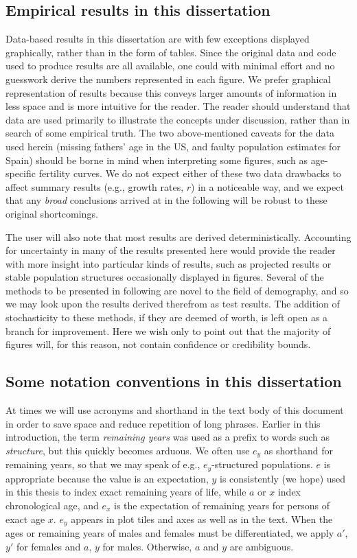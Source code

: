 \subsection{Empirical results in this dissertation}

Data-based results in this dissertation are with few exceptions displayed
graphically, rather than in the form of tables. Since the original data and
code used to produce results are all available, one could with minimal effort
and no guesswork derive the numbers represented in each figure. We prefer
graphical representation of results because this conveys larger amounts of
information in less space and is more intuitive for the reader. The reader
should understand that data are used primarily to illustrate the concepts under discussion, rather
than in search of some empirical truth. The two
above-mentioned caveats for the data used herein (missing fathers' age in the
US, and faulty population estimates for Spain) should be borne in mind when
interpreting some figures, such as age-specific fertility curves. We do not
expect either of these two data drawbacks to affect summary results 
(e.g., growth rates, $r$) in a noticeable way, and we expect that any
\textit{broad} conclusions arrived at in the following will be robust to these
original shortcomings. 

The user will also note that most results are derived deterministically.
Accounting for uncertainty in many of the results presented here would provide
the reader with more insight into particular kinds of results, such as projected
results or stable population structures occasionally displayed in figures.
Several of the methods to be presented in following are novel to the field of
demography, and so we may look upon the results derived therefrom as test
results. The addition of stochasticity to these methods, if they are deemed of
worth, is left open as a branch for improvement. Here we wish only to point out
that the majority of figures will, for this reason, not contain confidence or
credibility bounds.

\subsection{Some notation conventions in this dissertation}
At times we will use acronyms and shorthand in the text body of this document in
order to save space and reduce repetition of long phrases. Earlier in this
introduction, the term \textit{remaining years} was used as a prefix to words
such as \textit{structure}, but this quickly becomes arduous. We often use $e_y$
as shorthand for remaining years, so that we may speak of e.g., $e_y$-structured
populations. $e$ is appropriate because the value is an expectation, $y$ is
consistently (we hope) used in this thesis to index exact remaining years of
life, while $a$ or $x$ index chronological age, and $e_x$ is the expectation of 
remaining years for persons of exact age $x$. $e_y$ appears in plot tiles and
axes as well as in the text. When the ages or remaining years of males and
females must be differentiated, we apply $a'$, $y'$ for females and $a$, $y$ for
males. Otherwise, $a$ and $y$ are ambiguous.

